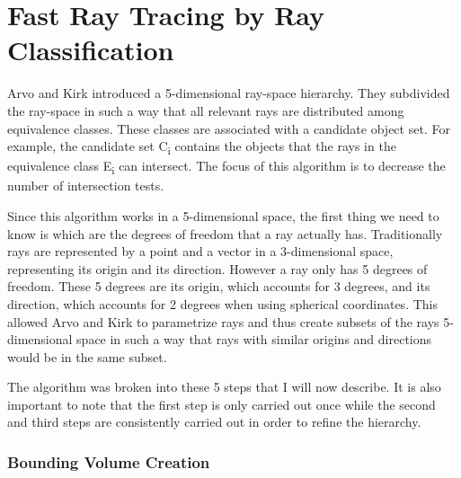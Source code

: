 \section{Fast Ray Tracing by Ray Classification}
\label{section:backgroud_arvo97}

Arvo and Kirk \cite{Arvo87} introduced a 5-dimensional ray-space hierarchy. They subdivided the ray-space in such a way that all relevant rays are distributed among equivalence classes. These classes are associated with a candidate object set. For example, the candidate set C\textsubscript{i} contains the objects that the rays in the equivalence class E\textsubscript{i} can intersect. The focus of this algorithm is to decrease the number of intersection tests.

\medskip

Since this algorithm works in a 5-dimensional space, the first thing we need to know is which are the degrees of freedom that a ray actually has. Traditionally rays are represented by a point and a vector in a 3-dimensional space, representing its origin and its direction. However a ray only has 5 degrees of freedom. These 5 degrees are its origin, which accounts for 3 degrees, and its direction, which accounts for 2 degrees when using spherical coordinates. This allowed Arvo and Kirk to parametrize rays and thus create subsets of the rays 5-dimensional space in such a way that rays with similar origins and directions would be in the same subset. 

\medskip

The algorithm was broken into these 5 steps that I will now describe. It is also important to note that the first step is only carried out once while the second and third steps are consistently carried out in order to refine the hierarchy.

\subsubsection{Bounding Volume Creation}

